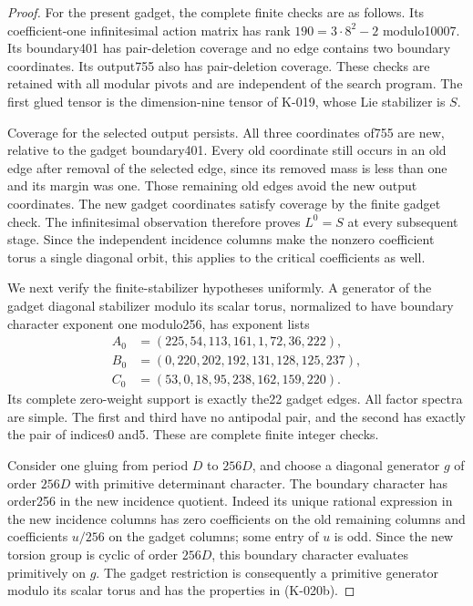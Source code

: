 \begin{proof}
For the present gadget, the complete finite checks are as follows.
Its coefficient-one infinitesimal action matrix has rank
$190=3\cdot8^2-2$ modulo10007.  Its boundary401 has pair-deletion
coverage and no edge contains two boundary coordinates.  Its
output755 also has pair-deletion coverage.  These checks are
retained with all modular pivots and are independent of the
search program.  The first glued tensor is the dimension-nine
tensor of K-019, whose Lie stabilizer is $S$.

Coverage for the selected output persists.  All three coordinates
of755 are new, relative to the gadget boundary401.  Every old
coordinate still occurs in an old edge after removal of the
selected edge, since its removed mass is less than one and its
margin was one.  Those remaining old edges avoid the new output
coordinates.  The new gadget coordinates satisfy coverage by the
finite gadget check.  The infinitesimal observation therefore
proves $L^0=S$ at every subsequent stage.  Since the independent
incidence columns make the nonzero coefficient torus a single
diagonal orbit, this applies to the critical coefficients as well.

We next verify the finite-stabilizer hypotheses uniformly.  A
generator of the gadget diagonal stabilizer modulo its scalar
torus, normalized to have boundary character exponent one
modulo256, has exponent lists
\[
\begin{aligned}
A_0&=(225,54,113,161,1,72,36,222),\\
B_0&=(0,220,202,192,131,128,125,237),\\
C_0&=(53,0,18,95,238,162,159,220).
\end{aligned}
                                                               \tag{K-020b}
\]
Its complete zero-weight support is exactly the22 gadget edges.
All factor spectra are simple.  The first and third have no
antipodal pair, and the second has exactly the pair of indices0
and5.  These are complete finite integer checks.

Consider one gluing from period $D$ to $256D$, and choose a
diagonal generator $g$ of order $256D$ with primitive determinant
character.  The boundary character has order256 in the new
incidence quotient.  Indeed its unique rational expression in
the new incidence columns has zero coefficients on the old
remaining columns and coefficients $u/256$ on the gadget columns;
some entry of $u$ is odd.  Since the new torsion group is cyclic
of order $256D$, this boundary character evaluates primitively
on $g$.  The gadget restriction is consequently a primitive
generator modulo its scalar torus and has the properties in
(K-020b).


\end{proof}
